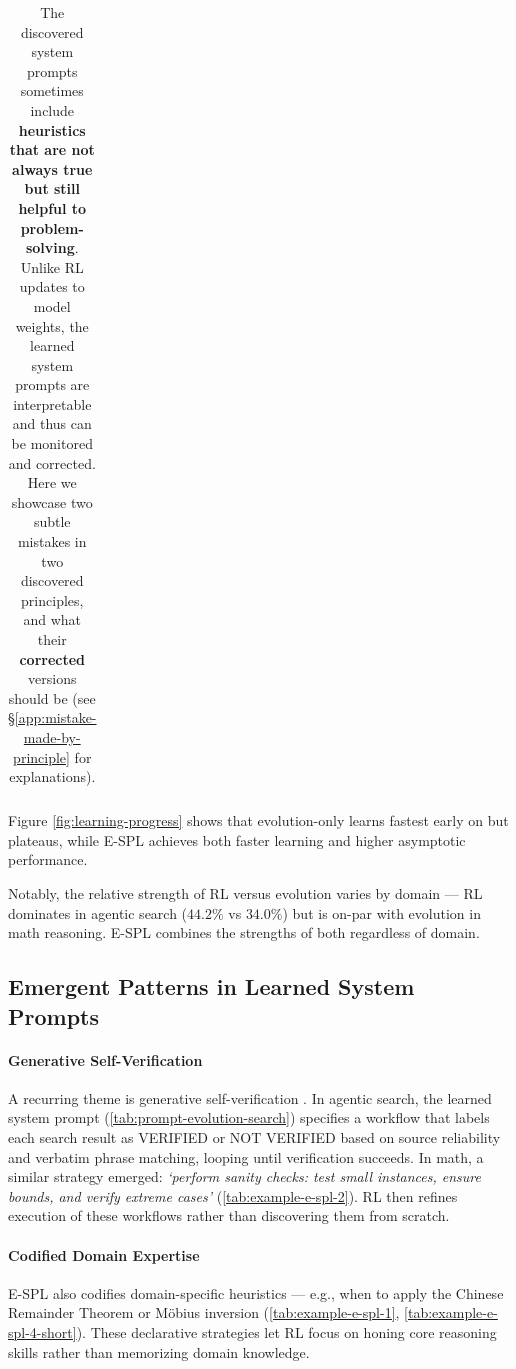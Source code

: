 \documentclass{article}
\theoremstyle{plain}
\theoremstyle{definition}
\theoremstyle{remark}
\begin{document}
\begin{table}[t]
\begin{tabular}{%
  p{}|
  >{\raggedright\arraybackslash\renewcommand{\baselinestretch}{1.15}\selectfont}p{}
}
\\
\bottomrule
\end{tabular}
\vspace{0pt}
\caption{
The discovered system prompts sometimes include \textbf{heuristics that are {\color{Brown}not always true} but still helpful to problem-solving}. Unlike RL updates to model weights, the learned system prompts are interpretable and thus can be monitored and corrected. Here we showcase two subtle mistakes in two discovered principles, and what their {\color{MidnightBlue}\textbf{corrected}} versions should be (see \S\ref{app:mistake-made-by-principle} for explanations).}
\vspace{-18pt}
\label{tab:corrected-principles}
\end{table}

Figure \ref{fig:learning-progress} shows that evolution-only learns fastest early on but plateaus, while E-SPL achieves both faster learning and higher asymptotic performance.

Notably, the relative strength of RL versus evolution varies by domain --- RL dominates in agentic search ($44.2\%$ vs $34.0\%$) but is on-par with evolution in math reasoning. E-SPL combines the strengths of both regardless of domain.

\vspace{-5pt}
\subsection{Emergent Patterns in Learned System Prompts}

\paragraph{Generative Self-Verification} A recurring theme is generative self-verification \citep{gen-verifier}. In agentic search, the learned system prompt (\autoref{tab:prompt-evolution-search}) specifies a workflow that labels each search result as VERIFIED or NOT VERIFIED based on source reliability and verbatim phrase matching, looping until verification succeeds. In math, a similar strategy emerged: \emph{`perform sanity checks: test small instances, ensure bounds, and verify extreme cases'} (\autoref{tab:example-e-spl-2}). RL then refines execution of these workflows rather than discovering them from scratch.

\vspace{-6pt}
\paragraph{Codified Domain Expertise} E-SPL also codifies domain-specific heuristics — e.g., when to apply the Chinese Remainder Theorem or Möbius inversion (\autoref{tab:example-e-spl-1}, \autoref{tab:example-e-spl-4-short}). These declarative strategies let RL focus on honing core reasoning skills rather than memorizing domain knowledge.
\end{document}
